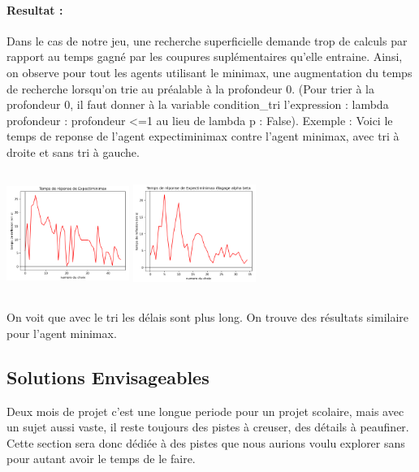             \paragraph{Resultat :}
                Dans le cas de notre jeu, une recherche superficielle demande trop de calculs par rapport au temps gagné par les coupures suplémentaires qu'elle entraine.
                Ainsi, on observe pour tout les agents utilisant le minimax, une augmentation du temps de recherche lorsqu'on trie au préalable à la profondeur 0. 
                (Pour trier à la profondeur 0, il faut donner à la variable condition\_tri l'expression : lambda profondeur : profondeur <=1 au lieu de lambda p : False).
                Exemple : Voici le temps de reponse de l'agent expectiminimax contre l'agent minimax, avec tri à droite et sans tri à gauche.
            
            \includegraphics[width=4cm,height=4cm]{graphiques/temps_alphbet2_alphabet_tri}
            \includegraphics[width=4cm,height=4cm]{graphiques/temps_alphbet2_alphabet1}
            
            On voit que avec le tri les délais sont plus long. On trouve des résultats similaire pour l'agent minimax.
    \subsection{Solutions Envisageables}
        Deux mois de projet c'est une longue periode pour un projet scolaire, mais avec un sujet aussi vaste, il reste toujours des pistes à creuser, des détails à peaufiner. Cette section sera donc dédiée à des pistes que nous aurions voulu explorer sans pour autant avoir le temps de le faire.
